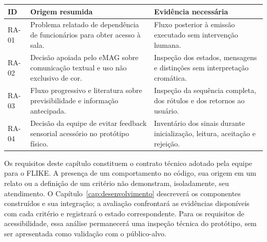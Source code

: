 \begin{quadro}[htb]
    \caption{Rastreabilidade dos requisitos de acessibilidade}
    \label{qua:rastreabilidade-ra}
    \small
    \renewcommand{\arraystretch}{1.12}
    \begin{tabular}{|>{\centering\arraybackslash}p{}|>{\raggedright\arraybackslash}p{}|>{\raggedright\arraybackslash}p{}|}
        \hline
        \textbf{ID} & \textbf{Origem resumida} & \textbf{Evidência necessária} \\ \hline
        RA-01 & Problema relatado de dependência de funcionários para obter acesso à sala. & Fluxo posterior à emissão executado sem intervenção humana. \\ \hline
        RA-02 & Decisão apoiada pelo eMAG sobre comunicação textual e uso não exclusivo de cor. & Inspeção dos estados, mensagens e distinções sem interpretação cromática. \\ \hline
        RA-03 & Fluxo progressivo e literatura sobre previsibilidade e informação antecipada. & Inspeção da sequência completa, dos rótulos e dos retornos ao usuário. \\ \hline
        RA-04 & Decisão da equipe de evitar feedback sensorial acessório no protótipo físico. & Inventário dos sinais durante inicialização, leitura, aceitação e rejeição. \\ \hline
    \end{tabular}
\end{quadro}

Os requisitos deste capítulo constituem o contrato técnico adotado pela equipe para o FLIKE. A presença de um comportamento no código, sua origem em um relato ou a definição de um critério não demonstram, isoladamente, seu atendimento. O Capítulo~\ref{cap:desenvolvimento} descreverá os componentes construídos e sua integração; a avaliação confrontará as evidências disponíveis com cada critério e registrará o estado correspondente. Para os requisitos de acessibilidade, essa análise permanecerá uma inspeção técnica do protótipo, sem ser apresentada como validação com o público-alvo.
